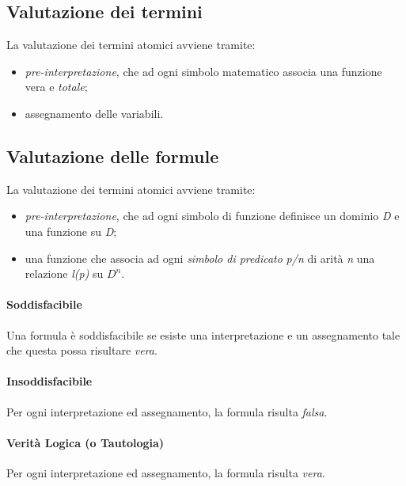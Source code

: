 \subsection{Valutazione dei termini}
La valutazione dei termini atomici avviene tramite:
\begin{itemize}
	\item \textit{pre-interpretazione}, che ad ogni simbolo matematico associa una funzione vera e \textit{totale};
	\item assegnamento delle variabili.
\end{itemize}

\subsection{Valutazione delle formule}
La valutazione dei termini atomici avviene tramite:
\begin{itemize}
	\item \textit{pre-interpretazione}, che ad ogni simbolo di funzione definisce un dominio \textit{D} e una funzione su \textit{D};
	\item una funzione che associa ad ogni \textit{simbolo di predicato} \textit{p/n} di arità \textit{n} una relazione \textit{l(p)} su $D^n$.
\end{itemize}

\paragraph{Soddisfacibile}
Una formula è soddisfacibile se esiste una interpretazione e un assegnamento tale che questa possa risultare \textit{vera}.
\paragraph{Insoddisfacibile}
Per ogni interpretazione ed assegnamento, la formula risulta \textit{falsa}.
\paragraph{Verità Logica (o Tautologia)}
Per ogni interpretazione ed assegnamento, la formula risulta \textit{vera}.

